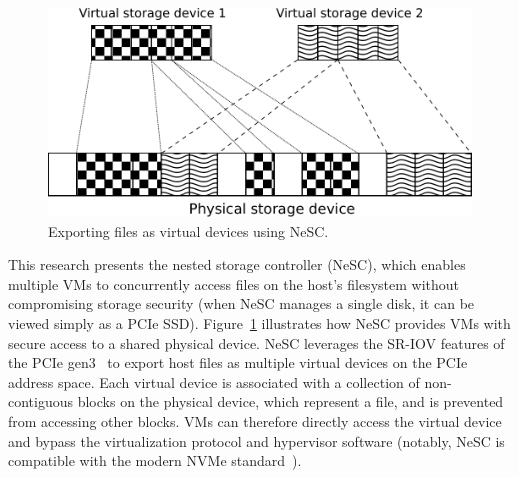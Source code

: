 \begin{figure}[t]
  \centering
  \includegraphics[width=\columnwidth]{figs/nesc-overview.pdf}
  \caption{Exporting files as virtual devices using NeSC.\label{fig:nesc_outline}}  
\end{figure}

This research presents the nested storage controller (NeSC), which enables multiple VMs to concurrently access files on the host's filesystem without compromising storage security (when NeSC manages a single disk, it can be viewed simply as a PCIe SSD).
Figure~\ref{fig:nesc_outline} illustrates how NeSC provides VMs with secure access to a shared physical device.
NeSC leverages the SR-IOV features of the PCIe gen3~\cite{pcisigiov} to export host files as multiple virtual devices on the PCIe address space. Each virtual device is associated with a collection of non-contiguous blocks on the physical device, which represent a file, and is prevented from accessing other blocks. VMs can therefore directly access the virtual device and bypass the virtualization protocol and hypervisor software (notably, NeSC is compatible with the modern NVMe standard~\cite{nvme}).




